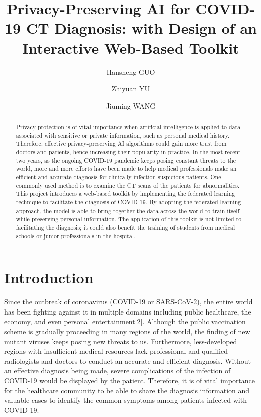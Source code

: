 \documentclass[12pt]{spie}
\title{Privacy-Preserving AI for COVID-19 CT Diagnosis: with Design of an Interactive Web-Based Toolkit}
\author[a] {Hansheng GUO}
\author[b] {Zhiyuan YU}
\author[c] {Jiuming WANG}
\affil[d]{The Chinese University of Hong Kong\\

Sha Tin, N.T, Hong Kong S.A.R., China\\}
\begin{document}
 

\maketitle

\begin{abstract}
Privacy protection is of vital importance when artificial intelligence is applied to data associated with sensitive or private information, such as personal medical history. Therefore, effective privacy-preserving AI algorithms could gain more trust from doctors and patients, hence increasing their popularity in practice. In the most recent two years, as the ongoing COVID-19 pandemic keeps posing constant threats to the world, more and more efforts have been made to help medical professionals make an efficient and accurate diagnosis for clinically infection-suspicious patients. One commonly used method is to examine the CT scans of the patients for abnormalities. This project introduces a web-based toolkit by implementing the federated learning technique to facilitate the diagnosis of COVID-19. By adopting the federated learning approach, the model is able to bring together the data across the world to train itself while preserving personal information. The application of this toolkit is not limited to facilitating the diagnosis; it could also benefit the training of students from medical schools or junior professionals in the hospital.  
\end{abstract}


\newpage

\tableofcontents

\newpage

\section{Introduction}
Since the outbreak of coronavirus (COVID-19 or SARS-CoV-2), the entire world has been fighting against it in multiple domains including public healthcare, the economy, and even personal entertainment[2]. Although the public vaccination scheme is gradually proceeding in many regions of the world, the finding of new mutant viruses keeps posing new threats to us. Furthermore, less-developed regions with insufficient medical resources lack professional and qualified radiologists and doctors to conduct an accurate and efficient diagnosis. Without an effective diagnosis being made, severe complications of the infection of COVID-19 would be displayed by the patient. Therefore, it is of vital importance for the healthcare community to be able to share the diagnosis information and valuable cases to identify the common symptoms among patients infected with COVID-19. 
\end{document}

